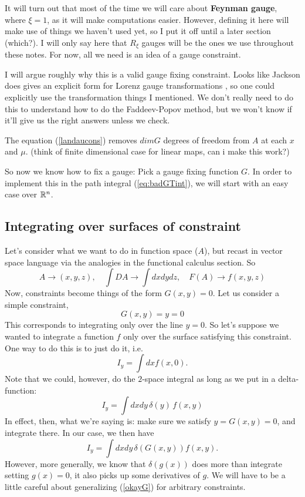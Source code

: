 \documentclass[main.tex]{subfiles}
\begin{document}
It will turn out that most of the time we will care about \textbf{Feynman gauge}, where $\xi = 1$, as it will make computations easier. However, defining it here will make use of things we haven't used yet, so I put it off until a later section (which?). I will only say here that $R_\xi$ gauges will be the ones we use throughout these notes. For now, all we need is an idea of a gauge constraint.

I will argue roughly why this is a valid gauge fixing constraint. Looks like Jackson does gives an explicit form for Lorenz gauge transformations \cite{jackson2}, so one could explicitly use the transformation things I mentioned. We don't really need to do this to understand how to do the Faddeev-Popov method, but we won't know if it'll give us the right answers unless we check.

The equation (\ref{landaucons}) removes $dim G$ degrees of freedom from $A$ at each $x$ and $\mu$. (think of finite dimensional case for linear maps, can i make this work?)

So now we know how to fix a gauge: Pick a gauge fixing function $G$. In order to implement this in the path integral (\ref{eq:badGTint}), we will start with an easy case over $\mathbb{R}^n$.

\subsection{Integrating over surfaces of constraint}
Let's consider what we want to do in function space ($A$), but recast in vector space language via the analogies in the functional calculus section. So 
\[A \to (x,y,z), \quad \int DA \to \int dxdydz, \quad F(A) \to f(x,y,z) \]
Now, constraints become things of the form $G(x,y) = 0$. Let us consider a simple constraint, 
\[
G(x,y) = y = 0
\]
This corresponds to integrating only over the line $y = 0$. So let's suppose we wanted to integrate a function $f$ only over the surface satisfying this constraint. One way to do this is to just do it, i.e.
\[
I_y = \int dx f(x,0). 
\]
Note that we could, however, do the $2$-space integral as long as we put in a delta-function:
\[
I_y = \int dx dy \, \delta(y) \, f(x,y)
\]
In effect, then, what we're saying is: make sure we satisfy $y = G(x,y) = 0$, and integrate there. In our case, we then have
\begin{equation} \label{okayG}
I_y = \int dx dy \, \delta(G(x,y)) f(x,y).
\end{equation}
However, more generally, we know that $\delta (g(x))$ does more than integrate setting $g(x) = 0$, it also picks up some derivatives of $g$. We will have to be a little careful about generalizing (\ref{okayG}) for arbitrary constraints.
\end{document}

